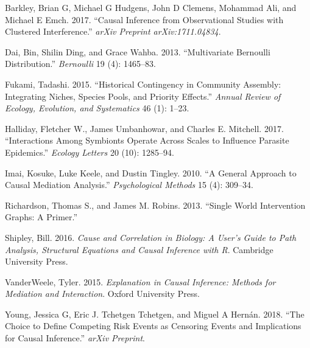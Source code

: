 \documentclass[]{article}
\begin{document}
\hypertarget{refs}{}
\leavevmode\hypertarget{ref-barkley2017causal}{}%
Barkley, Brian G, Michael G Hudgens, John D Clemens, Mohammad Ali, and
Michael E Emch. 2017. ``Causal Inference from Observational Studies with
Clustered Interference.'' \emph{arXiv Preprint arXiv:1711.04834}.

\leavevmode\hypertarget{ref-dai2013multivariate}{}%
Dai, Bin, Shilin Ding, and Grace Wahba. 2013. ``Multivariate Bernoulli
Distribution.'' \emph{Bernoulli} 19 (4): 1465--83.

\leavevmode\hypertarget{ref-fukami2015historical}{}%
Fukami, Tadashi. 2015. ``Historical Contingency in Community Assembly:
Integrating Niches, Species Pools, and Priority Effects.'' \emph{Annual
Review of Ecology, Evolution, and Systematics} 46 (1): 1--23.

\leavevmode\hypertarget{ref-halliday2017interactions}{}%
Halliday, Fletcher W., James Umbanhowar, and Charles E. Mitchell. 2017.
``Interactions Among Symbionts Operate Across Scales to Influence
Parasite Epidemics.'' \emph{Ecology Letters} 20 (10): 1285--94.

\leavevmode\hypertarget{ref-imai2010general}{}%
Imai, Kosuke, Luke Keele, and Dustin Tingley. 2010. ``A General Approach
to Causal Mediation Analysis.'' \emph{Psychological Methods} 15 (4):
309--34.

\leavevmode\hypertarget{ref-richardson2013primer}{}%
Richardson, Thomas S., and James M. Robins. 2013. ``Single World
Intervention Graphs: A Primer.''

\leavevmode\hypertarget{ref-shipley2016cause}{}%
Shipley, Bill. 2016. \emph{Cause and Correlation in Biology: A User's
Guide to Path Analysis, Structural Equations and Causal Inference with
R}. Cambridge University Press.

\leavevmode\hypertarget{ref-vanderweele2015explanation}{}%
VanderWeele, Tyler. 2015. \emph{Explanation in Causal Inference: Methods
for Mediation and Interaction}. Oxford University Press.

\leavevmode\hypertarget{ref-young2018the-choice}{}%
Young, Jessica G, Eric J. Tchetgen Tchetgen, and Miguel A Hernán. 2018.
``The Choice to Define Competing Risk Events as Censoring Events and
Implications for Causal Inference.'' \emph{arXiv Preprint}.
\end{document}
